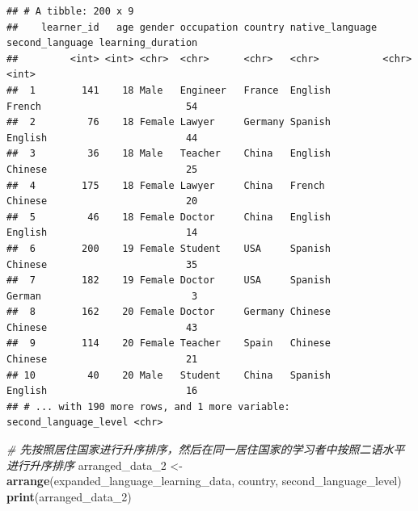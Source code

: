 \documentclass[]{book}
\newenvironment{Shaded}{\begin{snugshade}}{\end{snugshade}}
\newcommand{\CommentTok}[1]{\textcolor[rgb]{0.56,0.35,0.01}{\textit{#1}}}
\newcommand{\DecValTok}[1]{\textcolor[rgb]{0.00,0.00,0.81}{#1}}
\newcommand{\KeywordTok}[1]{\textcolor[rgb]{0.13,0.29,0.53}{\textbf{#1}}}
\newcommand{\NormalTok}[1]{#1}
\newcommand{\StringTok}[1]{\textcolor[rgb]{0.31,0.60,0.02}{#1}}
\begin{document}
\begin{verbatim}
## # A tibble: 200 x 9
##    learner_id   age gender occupation country native_language second_language learning_duration
##         <int> <int> <chr>  <chr>      <chr>   <chr>           <chr>                       <int>
##  1        141    18 Male   Engineer   France  English         French                         54
##  2         76    18 Female Lawyer     Germany Spanish         English                        44
##  3         36    18 Male   Teacher    China   English         Chinese                        25
##  4        175    18 Female Lawyer     China   French          Chinese                        20
##  5         46    18 Female Doctor     China   English         English                        14
##  6        200    19 Female Student    USA     Spanish         Chinese                        35
##  7        182    19 Female Doctor     USA     Spanish         German                          3
##  8        162    20 Female Doctor     Germany Chinese         Chinese                        43
##  9        114    20 Female Teacher    Spain   Chinese         Chinese                        21
## 10         40    20 Male   Student    China   Spanish         English                        16
## # ... with 190 more rows, and 1 more variable: second_language_level <chr>
\end{verbatim}

\begin{Shaded}
\begin{Highlighting}[]
\CommentTok{# 先按照居住国家进行升序排序，然后在同一居住国家的学习者中按照二语水平进行升序排序}
\NormalTok{arranged_data_}\DecValTok{2}\NormalTok{ <-}\StringTok{ }\KeywordTok{arrange}\NormalTok{(expanded_language_learning_data, country, second_language_level)}
\KeywordTok{print}\NormalTok{(arranged_data_}\DecValTok{2}\NormalTok{)}
\end{Highlighting}
\end{Shaded}
\end{document}
